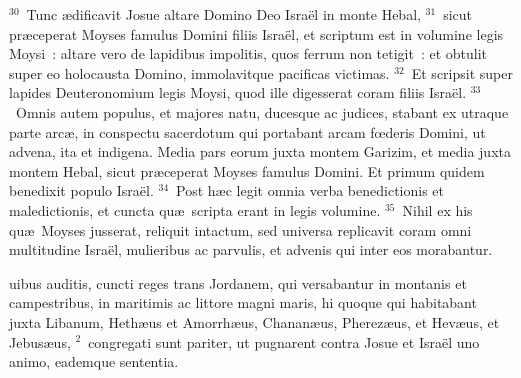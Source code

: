 ${}^{30}$~Tunc \ae dificavit Josue altare Domino Deo Isra\"el in monte Hebal,
${}^{31}$~sicut pr\ae ceperat Moyses famulus Domini filiis Isra\"el, et scriptum est in volumine legis Moysi~: altare vero de lapidibus impolitis, quos ferrum non tetigit~: et obtulit super eo holocausta Domino, immolavitque pacificas victimas.
${}^{32}$~Et scripsit super lapides Deuteronomium legis Moysi, quod ille digesserat coram filiis Isra\"el.
${}^{33}$~Omnis autem populus, et majores natu, ducesque ac judices, stabant ex utraque parte arc\ae , in conspectu sacerdotum qui portabant arcam fœderis Domini, ut advena, ita et indigena. Media pars eorum juxta montem Garizim, et media juxta montem Hebal, sicut pr\ae ceperat Moyses famulus Domini. Et primum quidem benedixit populo Isra\"el.
${}^{34}$~Post h\ae c legit omnia verba benedictionis et maledictionis, et cuncta qu\ae\ scripta erant in legis volumine.
${}^{35}$~Nihil ex his qu\ae\ Moyses jusserat, reliquit intactum, sed universa replicavit coram omni multitudine Isra\"el, mulieribus ac parvulis, et advenis qui inter eos morabantur.

\bchapter
{}uibus auditis, cuncti reges trans Jordanem, qui versabantur in montanis et campestribus, in maritimis ac littore magni maris, hi quoque qui habitabant juxta Libanum, Heth\ae us et Amorrh\ae us, Chanan\ae us, Pherez\ae us, et Hev\ae us, et Jebus\ae us,
${}^{2}$~congregati sunt pariter, ut pugnarent contra Josue et Isra\"el uno animo, eademque sententia.


